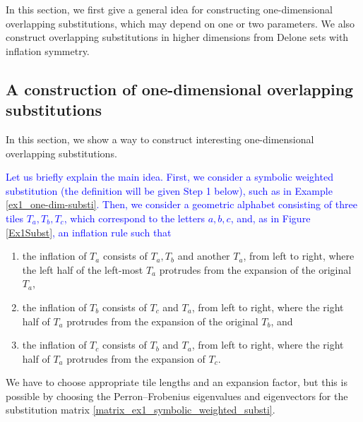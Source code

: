 \documentclass[a4]{amsart}
\theoremstyle{definition}
\newtheorem{ex}[theorem]{Example}
\begin{document}

{\color{blue} In this section, we first give a general idea for constructing one-dimensional overlapping substitutions, which may depend on one or two parameters.  We also construct overlapping substitutions in higher dimensions from Delone sets with inflation symmetry.}

\subsection{A construction of one-dimensional
overlapping substitutions}


\label{section_construction_one-dim}
In this section, we show a way to construct
interesting one-dimensional overlapping
substitutions.

\textcolor{blue}{Let us briefly explain the main idea. First, we consider a symbolic weighted substitution (the definition will be given Step 1 below), such as in Example \ref{ex1_one-dim-substi}.
Then, we consider a geometric alphabet consisting of three tiles
$T_a, T_b, T_c$, 
which correspond to the letters $a,b,c$,
and, as in Figure \ref{Ex1Subst}, an inflation rule such that}
\begin{enumerate}
    \item the inflation of $T_a$ consists of $T_a, T_b$ and another $T_a$, from left to right, where the left half of the left-most $T_a$ protrudes from the expansion of the original $T_a$,
    \item the inflation of $T_b$ consists of $T_c$ and $T_a$, from left to right, where the right  half of $T_a$ protrudes from the expansion of the original $T_b$, and
    \item the inflation of $T_c$ consists of $T_b$ and $T_a$, from left to right, where the right half of $T_a$ protrudes from the expansion of $T_c$.
\end{enumerate}
We have to choose appropriate tile lengths and an expansion factor, but this is possible by choosing the Perron--Frobenius eigenvalues and eigenvectors for the substitution matrix \eqref{matrix_ex1_symbolic_weighted_substi}.
\end{document}
